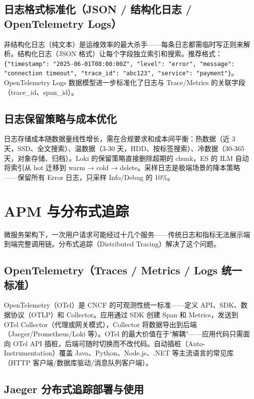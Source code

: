 \documentclass[12pt,UTF8]{ctexbook}
\begin{document}
  \section{日志格式标准化（JSON / 结构化日志 / OpenTelemetry Logs）}

非结构化日志（纯文本）是运维效率的最大杀手——每条日志都需临时写正则来解析。结构化日志（JSON 格式）让每个字段独立索引和搜索。推荐格式：\texttt{\{"timestamp": "2025-06-01T08:00:00Z", "level": "error", "message": "connection timeout", "trace\_id": "abc123", "service": "payment"\}}。OpenTelemetry Logs 数据模型进一步标准化了日志与 Trace/Metrics 的关联字段（trace\_id、span\_id）。

  \section{日志保留策略与成本优化}

日志存储成本随数据量线性增长，需在合规要求和成本间平衡：热数据（近 3 天，SSD、全文搜索）、温数据（3-30 天，HDD、按标签搜索）、冷数据（30-365 天，对象存储、归档）。Loki 的保留策略直接删除超期的 chunk，ES 的 ILM 自动将索引从 hot 迁移到 warm → cold → delete。采样日志是极端场景的降本策略——保留所有 Error 日志，只采样 Info/Debug 的 10\%。

\chapter{APM 与分布式追踪}
\label{chap:apm-tracing}

微服务架构下，一次用户请求可能经过十几个服务——传统日志和指标无法展示端到端完整调用链。分布式追踪（Distributed Tracing）解决了这个问题。

  \section{OpenTelemetry（Traces / Metrics / Logs 统一标准）}

OpenTelemetry（OTel）是 CNCF 的可观测性统一标准——定义 API、SDK、数据协议（OTLP）和 Collector。应用通过 SDK 创建 Span 和 Metrics，发送到 OTel Collector（代理或网关模式），Collector 将数据导出到后端（Jaeger/Prometheus/Loki 等）。OTel 的最大价值在于"解耦"——应用代码只需面向 OTel API 插桩，后端可随时切换而不改代码。自动插桩（Auto-Instrumentation）覆盖 Java、Python、Node.js、.NET 等主流语言的常见库（HTTP 客户端/数据库驱动/消息队列客户端）。

  \section{Jaeger 分布式追踪部署与使用}
\end{document}
